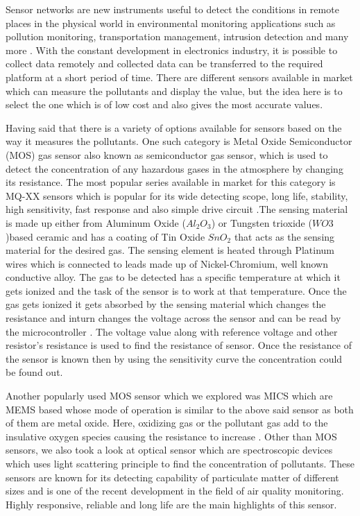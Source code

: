 Sensor networks are new instruments useful to detect the conditions in remote places in the physical world in environmental monitoring applications such as pollution monitoring, transportation management, intrusion detection and many more \cite{Jung2011}. With the constant development in electronics industry, it is possible to collect data remotely and collected data can be transferred to the required platform at a short period of time.
There are different sensors available in market which can measure the pollutants and display the value, but the idea here is to select the one which is of low cost and also gives the most accurate values.
\par
Having said that there is a variety of options available for sensors based on the way it measures the pollutants. One such category is Metal Oxide Semiconductor (MOS) gas sensor also known as semiconductor gas sensor, which is used to detect the concentration of any hazardous gases in the atmosphere by changing its resistance. The most popular series available in market for this category is MQ-XX sensors which is popular for its wide detecting scope, long life, stability, high sensitivity, fast response and also simple drive circuit \cite{Data2012}.The sensing material is made up either from Aluminum Oxide ($ Al_{2}O_{3}$) or Tungsten trioxide ($WO3$)based ceramic and has a coating of Tin Oxide $ SnO_{2} $ that acts as the sensing material for the desired gas. The sensing element is heated through Platinum wires which is connected to leads made up of Nickel-Chromium, well known conductive alloy. The gas to be detected has a specific temperature at which it gets ionized and the task of the sensor is to work at that temperature. Once the gas gets ionized it gets absorbed by the sensing material which changes the resistance and inturn changes the voltage across the sensor and can be read by the microcontroller \cite{gassensor}. The voltage value along with reference voltage and other resistor's resistance is used to find the resistance of sensor. Once the resistance of the sensor is known then by using the sensitivity curve the concentration could be found out. 

Another popularly used  MOS sensor which we explored was MICS which are MEMS based whose mode of operation is similar to the above said sensor as both of them are metal oxide. Here, oxidizing gas or the pollutant gas add to the insulative oxygen species causing the resistance to increase \cite{SGXSensortech}.
 Other than MOS sensors, we also took a look at optical sensor which are spectroscopic devices which uses light scattering principle to find the concentration of pollutants. These sensors are known for its detecting capability of particulate matter of different sizes and is one of the recent development in the field of air quality monitoring. Highly responsive, reliable and long life are the main highlights of this sensor.
